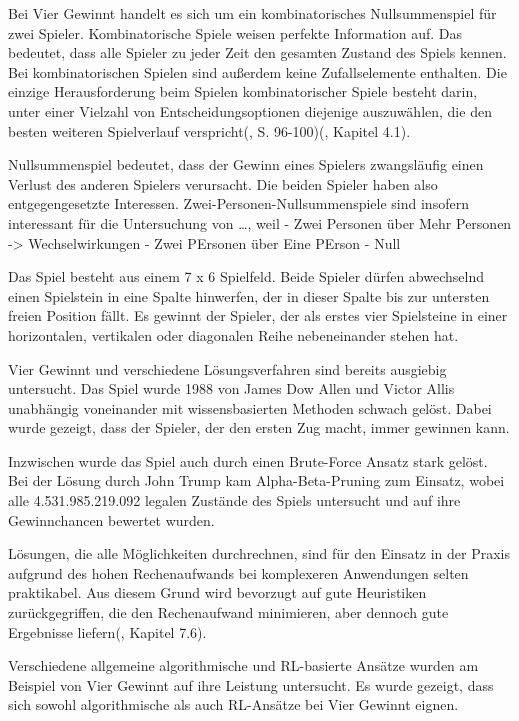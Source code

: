 Bei Vier Gewinnt handelt es sich um ein kombinatorisches Nullsummenspiel für zwei Spieler. Kombinatorische Spiele weisen \glqq perfekte Information \grqq{} auf. Das bedeutet, dass alle Spieler zu jeder Zeit den gesamten Zustand des Spiels kennen. Bei kombinatorischen Spielen sind außerdem keine Zufallselemente enthalten. Die einzige Herausforderung beim Spielen kombinatorischer Spiele besteht darin, unter einer Vielzahl von Entscheidungsoptionen diejenige auszuwählen, die den besten weiteren Spielverlauf verspricht(\cite{Bewersdorff.2018}, S. 96-100)(\cite{Ferguson.January2019}, Kapitel 4.1).

Nullsummenspiel bedeutet, dass der Gewinn eines Spielers zwangsläufig einen Verlust des anderen Spielers verursacht. Die beiden Spieler haben also entgegengesetzte Interessen.
Zwei-Personen-Nullsummenspiele sind insofern interessant für die Untersuchung von …, weil 
- Zwei Personen über Mehr Personen -> Wechselwirkungen
- Zwei PErsonen über Eine PErson
- Null

Das Spiel besteht aus einem 7 x 6 Spielfeld. Beide Spieler dürfen abwechselnd einen Spielstein in eine Spalte hinwerfen, der in dieser Spalte bis zur untersten freien Position fällt. Es gewinnt der Spieler, der als erstes vier Spielsteine in einer horizontalen, vertikalen oder diagonalen Reihe nebeneinander stehen hat\cite{MiltonBradleyCompany.1990}.

Vier Gewinnt und verschiedene Lösungsverfahren sind bereits ausgiebig untersucht. Das Spiel wurde 1988 von James Dow Allen und Victor Allis unabhängig voneinander mit wissensbasierten Methoden schwach gelöst. Dabei wurde gezeigt, dass der Spieler, der den ersten Zug macht, immer gewinnen kann\cite{Allen.2010}\cite{Allis.1988}.

Inzwischen wurde das Spiel auch durch einen Brute-Force Ansatz stark gelöst. Bei der Lösung durch John Trump kam Alpha-Beta-Pruning zum Einsatz, wobei alle 4.531.985.219.092 legalen Zustände des Spiels untersucht und auf ihre Gewinnchancen bewertet wurden\cite{Tromp}.

Lösungen, die alle Möglichkeiten durchrechnen, sind für den Einsatz in der Praxis aufgrund des hohen Rechenaufwands bei komplexeren Anwendungen selten praktikabel. Aus diesem Grund wird bevorzugt auf gute Heuristiken zurückgegriffen, die den Rechenaufwand minimieren, aber dennoch gute Ergebnisse liefern(\cite{Heineman.October2008}, Kapitel 7.6).

Verschiedene allgemeine algorithmische und RL-basierte Ansätze wurden am Beispiel von Vier Gewinnt auf ihre Leistung untersucht. Es wurde gezeigt, dass sich sowohl algorithmische als auch RL-Ansätze bei Vier Gewinnt eignen\cite{Alderton.2019}\cite{Thill.2012}\cite{Wäldchen.2022}\cite{Taylor.2024}\cite{Sheoran.2022}\cite{Qiu.2022}.
